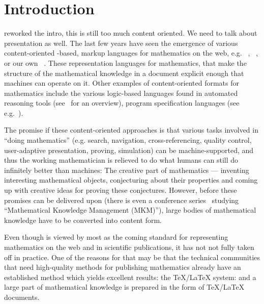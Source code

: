 \section{Introduction}\label{sec:intro}

\begin{newpart}{reworked the intro, this is still too much content oriented. We need to
    talk about presentation as well. }
The last few years have seen the emergence of various content-oriented {\xml}-based,
markup languages for mathematics on the web, e.g.  {\openmath}~\cite{BusCapCar:2oms04},
{\cmathml}~\cite{CarIon:MathML03}, or our own {\omdoc}~\cite{Kohlhase:omdoc1.2}. These
representation languages for mathematics, that make the structure of the mathematical
knowledge in a document explicit enough that machines can operate on it. Other examples of
content-oriented formats for mathematics include the various logic-based languages found
in automated reasoning tools (see~\cite{RobVor:hoar01} for an overview), program
specification languages (see e.g.~\cite{Bergstra:as89}).

The promise if these content-oriented approaches is that various tasks involved in ``doing
mathematics'' (e.g. search, navigation, cross-referencing, quality control, user-adaptive
presentation, proving, simulation) can be machine-supported, and thus the working
mathematician is relieved to do what humans can still do infinitely better than machines:
The creative part of mathematics --- inventing interesting mathematical objects,
conjecturing about their properties and coming up with creative ideas for proving these
conjectures. However, before these promises can be delivered upon (there is even a
conference series~\cite{MKM-IG-Meetings:web} studying ``Mathematical Knowledge Management
(MKM)''), large bodies of mathematical knowledge have to be converted into content form.

Even though {\mathml} is viewed by most as the coming standard for representing
mathematics on the web and in scientific publications, it has not not fully taken off in
practice. One of the reasons for that may be that the technical communities that need
high-quality methods for publishing mathematics already have an established method which
yields excellent results: the {\TeX/\LaTeX} system: and a large part of mathematical
knowledge is prepared in the form of {\TeX}/{\LaTeX} documents.


\end{newpart}
